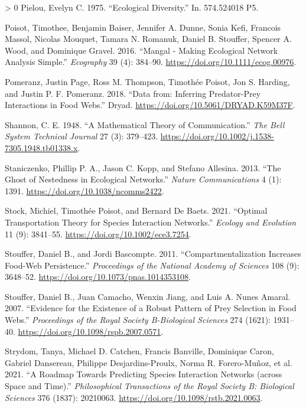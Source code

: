 \documentclass[11pt]{article}
\newlength{\cslhangindent}
\newenvironment{CSLReferences}[3] %
 {%
  \setlength{\parindent}{0pt}
  \ifodd #1 \everypar{\setlength{\hangindent}{\cslhangindent}}\ignorespaces\fi
  \ifnum #2 > 0
  \setlength{\parskip}{#2\baselineskip}
  \fi
 }%
 {}
\begin{document}
\begin{CSLReferences}{1}{0}
\leavevmode\hypertarget{ref-Pielou1975EcoDiv}{}%
Pielou, Evelyn C. 1975. {``Ecological Diversity.''} In. 574.524018 P5.

\leavevmode\hypertarget{ref-Poisot2016ManMakb}{}%
Poisot, Timothee, Benjamin Baiser, Jennifer A. Dunne, Sonia Kefi,
Francois Massol, Nicolas Mouquet, Tamara N. Romanuk, Daniel B. Stouffer,
Spencer A. Wood, and Dominique Gravel. 2016. {``Mangal - Making
Ecological Network Analysis Simple.''} \emph{Ecography} 39 (4): 384--90.
\url{https://doi.org/10.1111/ecog.00976}.

\leavevmode\hypertarget{ref-Pomeranz2018DatInf}{}%
Pomeranz, Justin Page, Ross M. Thompson, Timothée Poisot, Jon S.
Harding, and Justin P. F. Pomeranz. 2018. {``Data from: Inferring
Predator-Prey Interactions in Food Webs.''} Dryad.
\url{https://doi.org/10.5061/DRYAD.K59M37F}.

\leavevmode\hypertarget{ref-Shannon1948MatThe}{}%
Shannon, C. E. 1948. {``A Mathematical Theory of Communication.''}
\emph{The Bell System Technical Journal} 27 (3): 379--423.
\url{https://doi.org/10.1002/j.1538-7305.1948.tb01338.x}.

\leavevmode\hypertarget{ref-Staniczenko2013GhoNes}{}%
Staniczenko, Phillip P. A., Jason C. Kopp, and Stefano Allesina. 2013.
{``The Ghost of Nestedness in Ecological Networks.''} \emph{Nature
Communications} 4 (1): 1391. \url{https://doi.org/10.1038/ncomms2422}.

\leavevmode\hypertarget{ref-Stock2021OptTra}{}%
Stock, Michiel, Timothée Poisot, and Bernard De Baets. 2021. {``Optimal
Transportation Theory for Species Interaction Networks.''} \emph{Ecology
and Evolution} 11 (9): 3841--55.
\url{https://doi.org/10.1002/ece3.7254}.

\leavevmode\hypertarget{ref-Stouffer2011ComInc}{}%
Stouffer, Daniel B., and Jordi Bascompte. 2011. {``Compartmentalization
Increases Food-Web Persistence.''} \emph{Proceedings of the National
Academy of Sciences} 108 (9): 3648--52.
\url{https://doi.org/10.1073/pnas.1014353108}.

\leavevmode\hypertarget{ref-Stouffer2007EviExi}{}%
Stouffer, Daniel B., Juan Camacho, Wenxin Jiang, and Luis A. Nunes
Amaral. 2007. {``Evidence for the Existence of a Robust Pattern of Prey
Selection in Food Webs.''} \emph{Proceedings of the Royal Society
B-Biological Sciences} 274 (1621): 1931--40.
\url{https://doi.org/10.1098/rspb.2007.0571}.

\leavevmode\hypertarget{ref-Strydom2021RoaPre}{}%
Strydom, Tanya, Michael D. Catchen, Francis Banville, Dominique Caron,
Gabriel Dansereau, Philippe Desjardins-Proulx, Norma R. Forero-Muñoz, et
al. 2021. {``A Roadmap Towards Predicting Species Interaction Networks
(across Space and Time).''} \emph{Philosophical Transactions of the
Royal Society B: Biological Sciences} 376 (1837): 20210063.
\url{https://doi.org/10.1098/rstb.2021.0063}.


\end{CSLReferences}
\end{document}
